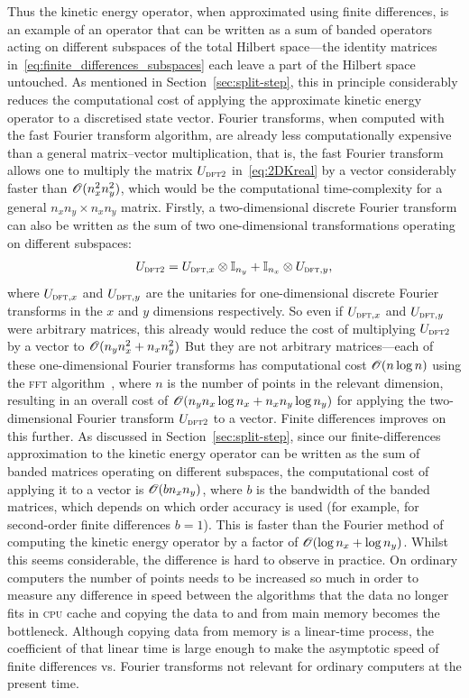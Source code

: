 Thus the kinetic energy operator, when approximated using finite differences, is an example of an operator that can be written as a sum of banded operators acting on different subspaces of the total Hilbert space---the identity matrices in~\eqref{eq:finite_differences_subspaces} each leave a part of the Hilbert space untouched. As mentioned in Section~\ref{sec:split-step}, this in principle considerably reduces the computational cost of applying the approximate kinetic energy operator to a discretised state vector. Fourier transforms, when computed with the fast Fourier transform algorithm, are already less computationally expensive than a general matrix--vector multiplication, that is, the fast Fourier transform allows one to multiply the matrix $U_{\textsc{dft2}}$ in~\eqref{eq:2DKreal} by a vector considerably faster than $\mathscr{O}(n_x^2n_y^2)$, which would be the computational time-complexity for a general $n_xn_y \times n_xn_y$ matrix. Firstly, a two-dimensional discrete Fourier transform can also be written as the sum of two one-dimensional transformations operating on different subspaces:
\begin{align}
U_{\textsc{dft2}} =
U_{\textsc{dft},x} \otimes \mathbb{I}_{n_y} + \mathbb{I}_{n_x} \otimes U_{\textsc{dft},y},
\end{align}
where $U_{\textsc{dft},x}$ and $U_{\textsc{dft},y}$ are the unitaries for one-dimensional discrete Fourier transforms in the $x$ and $y$ dimensions respectively. So even if $U_{\textsc{dft},x}$ and $U_{\textsc{dft},y}$ were arbitrary matrices, this already would reduce the cost of multiplying $U_{\textsc{dft2}}$ by a vector to $\mathscr{O}(n_y n_x^2 + n_x n_y^2)$ But they are not arbitrary matrices---each of these one-dimensional Fourier transforms has computational cost $\mathscr{O}(n \log n)$ using the \textsc{fft} algorithm~\cite[p.~600]{press2007numerical}, where $n$ is the number of points in the relevant dimension, resulting in an overall cost of $\mathscr{O}(n_y n_x \log n_x + n_x n_y\log n_y)$ for applying the two-dimensional Fourier transform $U_{\textsc{dft2}}$ to a vector. Finite differences improves on this further. As discussed in Section~\ref{sec:split-step}, since our finite-differences approximation to the kinetic energy operator can be written as the sum of banded matrices operating on different subspaces, the computational cost of applying it to a vector is $\mathscr{O}(bn_xn_y)$, where $b$ is the bandwidth of the banded matrices, which depends on which order accuracy is used (for example, for second-order finite differences $b=1$). This is faster than the Fourier method of computing the kinetic energy operator by a factor of $\mathscr{O}(\log n_x + \log n_y)$. Whilst this seems considerable, the difference is hard to observe in practice. On ordinary computers the number of points needs to be increased so much in order to measure any difference in speed between the algorithms that the data no longer fits in \textsc{cpu} cache and copying the data to and from main memory becomes the bottleneck. Although copying data from memory is a linear-time process, the coefficient of that linear time is large enough to make the asymptotic speed of finite differences vs. Fourier transforms not relevant for ordinary computers at the present time.


